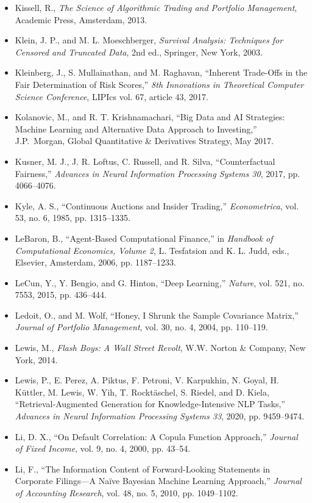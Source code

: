 \documentclass{book}
\begin{document}
\begin{itemize}
    \item Kissell, R., \emph{The Science of Algorithmic Trading and Portfolio Management}, Academic Press, Amsterdam, 2013.
    \item Klein, J. P., and M. L. Moeschberger, \emph{Survival Analysis: Techniques for Censored and Truncated Data}, 2nd ed., Springer, New York, 2003.
    \item Kleinberg, J., S. Mullainathan, and M. Raghavan, ``Inherent Trade-Offs in the Fair Determination of Risk Scores,'' \emph{8th Innovations in Theoretical Computer Science Conference}, LIPIcs vol. 67, article 43, 2017.
    \item Kolanovic, M., and R. T. Krishnamachari, ``Big Data and AI Strategies: Machine Learning and Alternative Data Approach to Investing,'' J.P.\ Morgan, Global Quantitative \& Derivatives Strategy, May 2017.
    \item Kusner, M. J., J. R. Loftus, C. Russell, and R. Silva, ``Counterfactual Fairness,'' \emph{Advances in Neural Information Processing Systems 30}, 2017, pp. 4066--4076.
    \item Kyle, A. S., ``Continuous Auctions and Insider Trading,'' \emph{Econometrica}, vol. 53, no. 6, 1985, pp. 1315--1335.
    \item LeBaron, B., ``Agent-Based Computational Finance,'' in \emph{Handbook of Computational Economics, Volume 2}, L. Tesfatsion and K. L. Judd, eds., Elsevier, Amsterdam, 2006, pp. 1187--1233.
    \item LeCun, Y., Y. Bengio, and G. Hinton, ``Deep Learning,'' \emph{Nature}, vol. 521, no. 7553, 2015, pp. 436--444.
    \item Ledoit, O., and M. Wolf, ``Honey, I Shrunk the Sample Covariance Matrix,'' \emph{Journal of Portfolio Management}, vol. 30, no. 4, 2004, pp. 110--119.
    \item Lewis, M., \emph{Flash Boys: A Wall Street Revolt}, W.W. Norton \& Company, New York, 2014.
    \item Lewis, P., E. Perez, A. Piktus, F. Petroni, V. Karpukhin, N. Goyal, H. Küttler, M. Lewis, W. Yih, T. Rocktäschel, S. Riedel, and D. Kiela, ``Retrieval-Augmented Generation for Knowledge-Intensive NLP Tasks,'' \emph{Advances in Neural Information Processing Systems 33}, 2020, pp. 9459--9474.
    \item Li, D. X., ``On Default Correlation: A Copula Function Approach,'' \emph{Journal of Fixed Income}, vol. 9, no. 4, 2000, pp. 43--54.
    \item Li, F., ``The Information Content of Forward-Looking Statements in Corporate Filings---A Na\"ive Bayesian Machine Learning Approach,'' \emph{Journal of Accounting Research}, vol. 48, no. 5, 2010, pp. 1049--1102.

\end{itemize}
\end{document}
